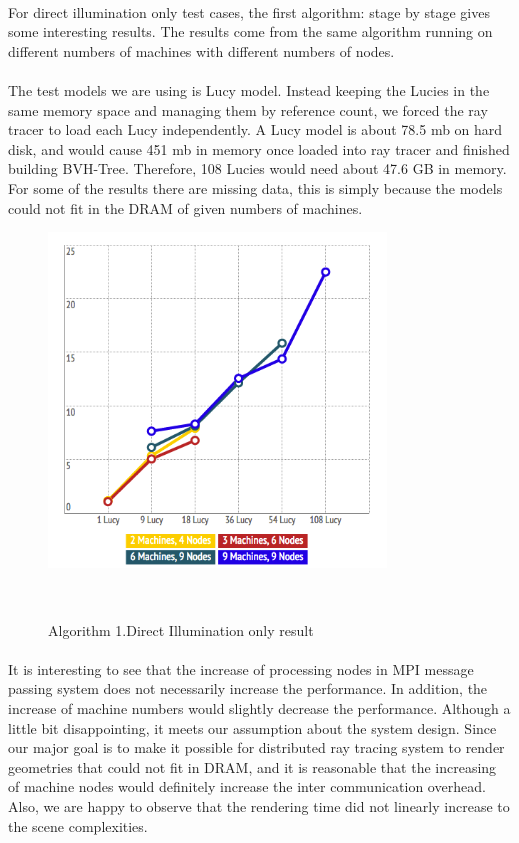 \documentclass[a4paper, oneside, 10pt]{article}
\begin{document}
\paragraph{} For direct illumination only test cases, the first algorithm: stage by stage gives some interesting results. The results come from the same algorithm running on different numbers of machines with different numbers of nodes. 
\paragraph{} The test models we are using is Lucy model. Instead keeping the Lucies in the same memory space and managing them by reference count, we forced the ray tracer to load each Lucy independently. A Lucy model is about 78.5 mb on hard disk, and would cause 451 mb in memory once loaded into ray tracer and finished building BVH-Tree. Therefore, 108 Lucies would need about 47.6 GB in memory. For some of the results there are missing data, this is simply because the models could not fit in the DRAM of given numbers of machines.
\begin{figure}[h]
\centering
\includegraphics[width=0.8\textwidth]{res1}
\caption{Algorithm 1.Direct Illumination only result}\
\end{figure}
\paragraph{}It is interesting to see that the increase of processing nodes in MPI message passing system does not necessarily increase the performance. In addition, the increase of machine numbers would slightly decrease the performance. Although a little bit disappointing, it meets our assumption about the system design. Since our major goal is to make it possible for distributed ray tracing system to render geometries that could not fit in DRAM, and it is reasonable that the increasing of machine nodes would definitely increase the inter communication overhead. Also, we are happy to observe that the rendering time did not linearly increase to the scene complexities. 
\end{document}
